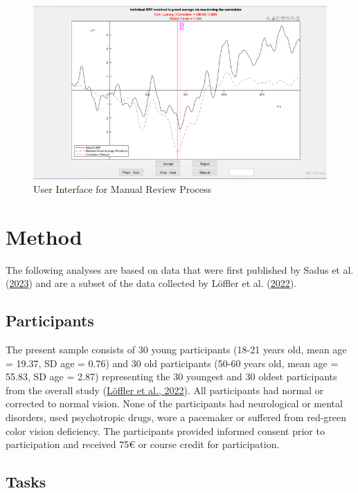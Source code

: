 \documentclass[
  man]{apa7}
\begin{document}
\begin{figure}
\includegraphics[width=0.75\linewidth]{images/review_gui_example} \caption{User Interface for Manual Review Process}\label{fig:review-gui-example}
\end{figure}

\hypertarget{method}{%
\section{Method}\label{method}}

The following analyses are based on data that were first published by Sadus et al. (\protect\hyperlink{ref-sadus2023multiverse}{2023}) and are a subset of the data collected by Löffler et al. (\protect\hyperlink{ref-loffler2022common}{2022}).

\hypertarget{participants}{%
\subsection{Participants}\label{participants}}

The present sample consists of 30 young participants (18-21 years old, mean age = 19.37, SD age = 0.76) and 30 old participants (50-60 years old, mean age = 55.83, SD age = 2.87) representing the 30 youngest and 30 oldest participants from the overall study (\protect\hyperlink{ref-loffler2022common}{Löffler et al., 2022}). All participants had normal or corrected to normal vision. None of the participants had neurological or mental disorders, used psychotropic drugs, wore a pacemaker or suffered from red-green color vision deficiency. The participants provided informed consent prior to participation and received 75€ or course credit for participation.

\hypertarget{tasks}{%
\subsection{Tasks}\label{tasks}}
\end{document}
